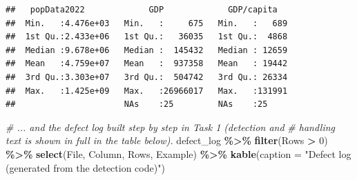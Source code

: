 \documentclass[
]{article}
\newenvironment{Shaded}{\begin{snugshade}}{\end{snugshade}}
\newcommand{\AttributeTok}[1]{\textcolor[rgb]{0.13,0.29,0.53}{#1}}
\newcommand{\CommentTok}[1]{\textcolor[rgb]{0.56,0.35,0.01}{\textit{#1}}}
\newcommand{\DecValTok}[1]{\textcolor[rgb]{0.00,0.00,0.81}{#1}}
\newcommand{\FunctionTok}[1]{\textcolor[rgb]{0.13,0.29,0.53}{\textbf{#1}}}
\newcommand{\NormalTok}[1]{#1}
\newcommand{\SpecialCharTok}[1]{\textcolor[rgb]{0.81,0.36,0.00}{\textbf{#1}}}
\newcommand{\StringTok}[1]{\textcolor[rgb]{0.31,0.60,0.02}{#1}}
\begin{document}
\begin{verbatim}
##   popData2022             GDP             GDP/capita    
##  Min.   :4.476e+03   Min.   :     675   Min.   :   689  
##  1st Qu.:2.433e+06   1st Qu.:   36035   1st Qu.:  4868  
##  Median :9.678e+06   Median :  145432   Median : 12659  
##  Mean   :4.759e+07   Mean   :  937358   Mean   : 19442  
##  3rd Qu.:3.303e+07   3rd Qu.:  504742   3rd Qu.: 26334  
##  Max.   :1.425e+09   Max.   :26966017   Max.   :131991  
##                      NAs    :25         NAs    :25
\end{verbatim}

\begin{Shaded}
\begin{Highlighting}[]
\CommentTok{\# ... and the defect log built step by step in Task 1 (detection and}
\CommentTok{\# handling text is shown in full in the table below).}
\NormalTok{defect\_log }\SpecialCharTok{\%\textgreater{}\%}
  \FunctionTok{filter}\NormalTok{(Rows }\SpecialCharTok{\textgreater{}} \DecValTok{0}\NormalTok{) }\SpecialCharTok{\%\textgreater{}\%}
  \FunctionTok{select}\NormalTok{(File, Column, Rows, Example) }\SpecialCharTok{\%\textgreater{}\%}
  \FunctionTok{kable}\NormalTok{(}\AttributeTok{caption =} \StringTok{"Defect log (generated from the detection code)"}\NormalTok{)}
\end{Highlighting}
\end{Shaded}
\end{document}
